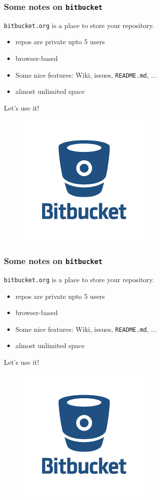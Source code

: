 \documentclass{beamer}
\begin{document}
\begin{frame}
 \frametitle{Some notes on \texttt{bitbucket}}
 \vspace{1.5cm}
 \texttt{bitbucket.org} is a place to store your repository.
 \begin{itemize}
  \item repos are {\color{red}private} upto 5 users
  \item browser-based
  \item Some nice features: Wiki, issues, \texttt{README.md}, ...
  \item almost unlimited space
 \end{itemize}
  \vspace{0.4cm}
{\color{white}Let's use it!}
 \vspace{-1cm}
\begin{figure}
\hfill \includegraphics[scale=0.35]{images/bitbucket-logo}
\end{figure}
\end{frame}

\begin{frame}
 \frametitle{Some notes on \texttt{bitbucket}}
 \vspace{1.5cm}
 \texttt{bitbucket.org} is a place to store your repository.
 \begin{itemize}
  \item repos are {\color{red}private} upto 5 users
  \item browser-based
  \item Some nice features: Wiki, issues, \texttt{README.md}, ...
  \item almost unlimited space
 \end{itemize}
 \vspace{0.4cm}
 Let's use it!
 \vspace{-1cm}
\begin{figure}
\hfill \includegraphics[scale=0.35]{images/bitbucket-logo}
\end{figure}
\end{frame}
\end{document}
